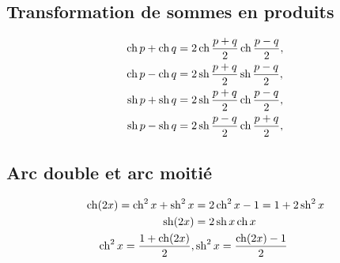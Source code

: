 \subsection{Transformation de sommes en produits}

\begin{align}
  \hcos p + \hcos q &= 2 \hcos \frac{p+q}{2} \hcos \frac{p-q}{2}, \\ \hcos p - \hcos q &= 2 \hsin \frac{p+q}{2} \hsin \frac{p-q}{2},\\
  \hsin p + \hsin q &= 2 \hsin \frac{p+q}{2} \hcos \frac{p-q}{2}, \\ \hsin p - \hsin q &= 2 \hsin \frac{p-q}{2} \hcos \frac{p+q}{2},
\end{align}

\subsection{Arc double et arc moitié}

\begin{align}
  \hcos(2x)=\hcos^2 x + \hsin^2 x &= 2\hcos^2 x -1 = 1+2\hsin^2 x \\
  \hsin(2x)&=2\hsin x \hcos x \\
  \hcos^2 x = \frac{1+\hcos(2x)}{2}, & \hsin^2 x = \frac{\hcos(2x)-1}{2}
\end{align}

